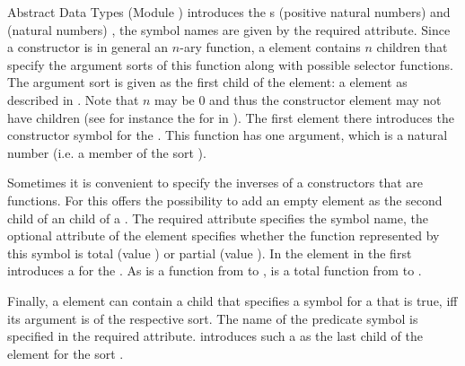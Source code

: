 \begin{tchapter}[id=adt,short=Abstract Data Types]{Abstract Data Types (Module {})}
{} introduces the {s} {}
(positive natural numbers) and {} (natural numbers) , the symbol names are
given by the required {} attribute. Since a constructor is in
general an $n$-ary function, a {} element contains $n$
{} children that specify the argument sorts of this function along with
possible selector functions. The argument sort is given as the first child of the
{} element: a {} element as described in
{}.  Note that $n$ may be 0 and thus the constructor element may not
have {} children (see for instance the {} for
{} in {}). The first {} element there
introduces the constructor symbol {} for the
{}. This function has one argument, which is a natural number
(i.e. a member of the sort {}).

Sometimes it is convenient to specify the inverses of a constructors that are
functions. For this {\omdoc} offers the possibility to add an empty {}
element as the second child of an {} child of a
{}. The required attribute {} specifies the
symbol name, the optional {} attribute of the
{} element specifies whether the function represented by this symbol is
total (value {}) or
partial (value {}).  In
{} the {} element in the first {}
introduces a {} for the {}
{}. As {} is a function from {} to
{}, {} is a total function from {} to
{}.

Finally, a {} element can contain a {} child that
specifies a symbol for a {} that is true, iff its argument is of the
respective sort. The name of the predicate symbol is specified in the required
{} attribute. {} introduces such a
{} as the last child of the {} element for
the sort {}.


\end{tchapter}
